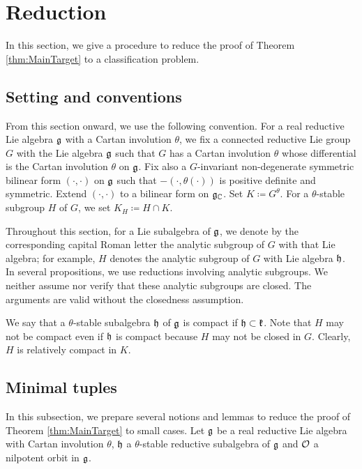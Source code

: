 

\section{Reduction} \label{section:Reduction}

In this section, we give a procedure to reduce the proof of Theorem \ref{thm:MainTarget} to a classification problem.

\subsection{Setting and conventions}

From this section onward, we use the following convention.
For a real reductive Lie algebra $\mathfrak{g}$ with a Cartan involution $\theta$, we fix a connected reductive Lie group $G$ with the Lie algebra $\mathfrak{g}$ such that $G$ has a Cartan involution $\theta$ whose differential is the Cartan involution $\theta$ on $\mathfrak{g}$.
Fix also a $G$-invariant non-degenerate symmetric bilinear form $(\cdot, \cdot)$ on $\mathfrak{g}$ such that $-(\cdot, \theta(\cdot))$ is positive definite and symmetric.
Extend $(\cdot, \cdot)$ to a bilinear form on $\mathfrak{g}_{\mathbb{C}}$.
Set $K \coloneq G^\theta$.
For a $\theta$-stable subgroup $H$ of $G$, we set $K_H \coloneq H \cap K$.

Throughout this section, for a Lie subalgebra of $\mathfrak{g}$, we denote by the corresponding capital Roman letter the analytic subgroup of $G$ with that Lie algebra; for example, $H$ denotes the analytic subgroup of $G$ with Lie algebra $\mathfrak{h}$.
In several propositions, we use reductions involving analytic subgroups.
We neither assume nor verify that these analytic subgroups are closed.
The arguments are valid without the closedness assumption.

We say that a $\theta$-stable subalgebra $\mathfrak{h}$ of $\mathfrak{g}$ is compact if $\mathfrak{h} \subset \mathfrak{k}$.
Note that $H$ may not be compact even if $\mathfrak{h}$ is compact because $H$ may not be closed in $G$.
Clearly, $H$ is relatively compact in $K$.

\subsection{Minimal tuples}

In this subsection, we prepare several notions and lemmas to reduce the proof of Theorem \ref{thm:MainTarget} to small cases.
Let $\mathfrak{g}$ be a real reductive Lie algebra with Cartan involution $\theta$, $\mathfrak{h}$ a $\theta$-stable reductive subalgebra of $\mathfrak{g}$ and $\mathcal{O}$ a nilpotent orbit in $\mathfrak{g}$.

